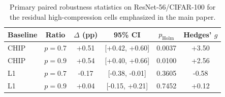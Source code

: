 \begin{table}[t]
\caption{Primary paired robustness statistics on ResNet-56/CIFAR-100 for the residual high-compression cells emphasized in the main paper.}
\label{tab:paired_robustness_ivc}
\scriptsize
\begin{tabular*}{\linewidth}{@{\extracolsep\fill}lccccc}
\toprule
Baseline & Ratio & $\Delta$ (pp) & 95\% CI & $p_{\mathrm{Holm}}$ & Hedges' $g$ \\
\midrule
CHIP & $p=0.7$ & +0.51 & [+0.42, +0.60] & 0.0037 & +3.50 \\
CHIP & $p=0.9$ & +0.54 & [+0.40, +0.66] & 0.0100 & +2.56 \\
L1 & $p=0.7$ & -0.17 & [-0.38, -0.01] & 0.3605 & -0.58 \\
L1 & $p=0.9$ & +0.04 & [-0.15, +0.21] & 0.7452 & +0.12 \\
\bottomrule
\end{tabular*}
\end{table}
